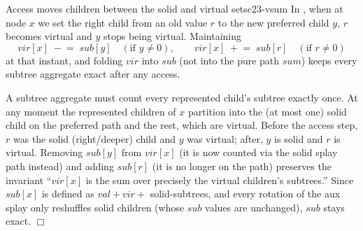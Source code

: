\begin{theorem}{Access moves children between the solid and virtual sets}{c23-vsum}
In , when at node \(x\) we set the right child from an old value \(r\) to
the new preferred child \(y\), \(r\) becomes virtual and \(y\) stops being virtual.
Maintaining
\[
  \mathit{vir}[x]\;\mathrel{-}=\;\mathit{sub}[y]\quad(\text{if }y\ne 0),\qquad
  \mathit{vir}[x]\;\mathrel{+}=\;\mathit{sub}[r]\quad(\text{if }r\ne 0)
\]
at that instant, and folding \(\mathit{vir}\) into \(\mathit{sub}\) (not into the pure
path \(\mathit{sum}\)) keeps every subtree aggregate exact after any access.
\end{theorem}
\begin{proofbox}
A subtree aggregate must count every represented child's subtree exactly once. At
any moment the represented children of \(x\) partition into the (at most one) solid
child on the preferred path and the rest, which are virtual. Before the access step,
\(r\) was the solid (right/deeper) child and \(y\) was virtual; after, \(y\) is solid
and \(r\) is virtual. Removing \(\mathit{sub}[y]\) from \(\mathit{vir}[x]\) (it is now
counted via the solid splay path instead) and adding \(\mathit{sub}[r]\) (it is no
longer on the path) preserves the invariant ``\(\mathit{vir}[x]\) is the sum over
precisely the virtual children's subtrees.'' Since \(\mathit{sub}[x]\) is defined as
\(\mathit{val}+\mathit{vir}+\) solid-subtrees, and every rotation of the aux splay only
reshuffles solid children (whose \(\mathit{sub}\) values are unchanged), \(\mathit{sub}\)
stays exact. \(\Box\)
\end{proofbox}

